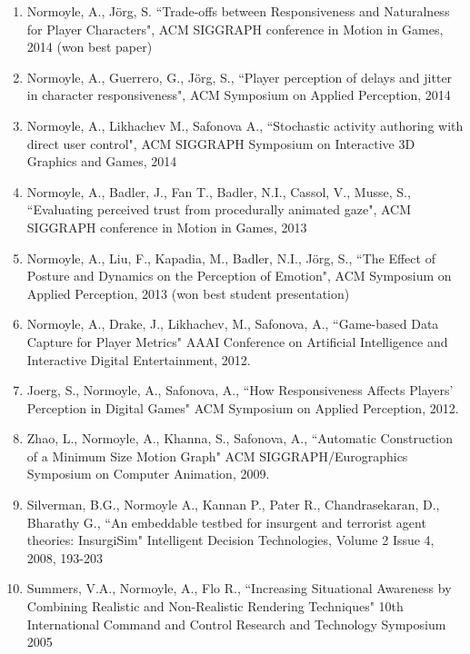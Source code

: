 \begin{enumerate}[leftmargin=*]
\item Normoyle, A., J\"{o}rg, S. ``Trade-offs between Responsiveness and Naturalness for Player Characters", 
ACM SIGGRAPH conference in Motion in Games, 2014 (won best paper)

\item Normoyle, A., Guerrero, G., J\"{o}rg, S., ``Player perception of delays and jitter in character responsiveness", 
ACM Symposium on Applied Perception, 2014 

\item Normoyle, A., Likhachev M., Safonova A., ``Stochastic activity authoring with direct user control", 
ACM SIGGRAPH Symposium on Interactive 3D Graphics and Games, 2014 

\item Normoyle, A., Badler, J., Fan T., Badler, N.I., Cassol, V., Musse, S., ``Evaluating perceived trust from procedurally animated gaze", ACM SIGGRAPH conference in Motion in Games, 2013 

\item Normoyle, A., Liu, F., Kapadia, M., Badler, N.I., J\"{o}rg, S., ``The Effect of Posture and Dynamics on the Perception of Emotion", ACM Symposium on Applied Perception, 2013 (won best student presentation)

\item Normoyle, A., Drake, J., Likhachev, M., Safonova, A., ``Game-based Data Capture for Player Metrics" 
AAAI Conference on Artificial Intelligence and Interactive Digital Entertainment, 2012.

\item Joerg, S., Normoyle, A., Safonova, A., ``How Responsiveness Affects Players' Perception in Digital Games" 
ACM Symposium on Applied Perception, 2012.

\item Zhao, L., Normoyle, A., Khanna, S., Safonova, A., ``Automatic Construction of a Minimum Size Motion Graph" ACM SIGGRAPH/Eurographics Symposium on Computer Animation, 2009.

\item Silverman, B.G., Normoyle A., Kannan P., Pater R., Chandrasekaran, D., Bharathy G., ``An embeddable testbed for insurgent and terrorist agent theories: InsurgiSim" Intelligent Decision Technologies, Volume 2 Issue 4, 2008, 193-203

\item Summers, V.A., Normoyle, A., Flo R., ``Increasing Situational Awareness by Combining Realistic and Non-Realistic Rendering Techniques" 10th International Command and Control Research and Technology Symposium 2005
\end{enumerate}
\medskip
\medskip

